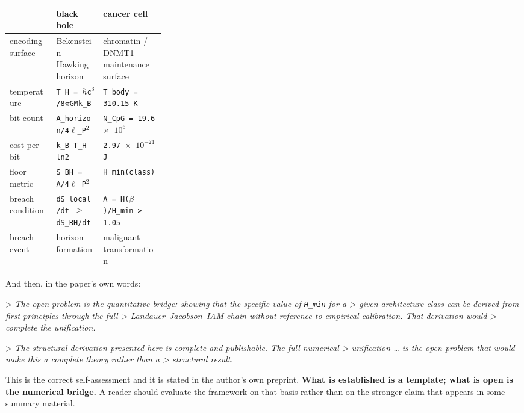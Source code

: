 \documentclass[12pt,a4paper]{article}
\begin{document}
\begin{small}
\begin{tabularx}{\linewidth}{L{0.30\linewidth}YY}
\toprule
\textbf{} & \textbf{black hole} & \textbf{cancer cell} \\
\midrule
encoding surface & Bekenstein--Hawking horizon & chromatin / DNMT1 maintenance surface \\
temperature & \texttt{T\_\allowbreak{}H = $\hbar$c$^{3}$/\allowbreak{}8$\pi$GMk\_\allowbreak{}B} & \texttt{T\_\allowbreak{}body = 310.15 K} \\
bit count & \texttt{A\_\allowbreak{}horizon/\allowbreak{}4$\ell$\_\allowbreak{}P$^{2}$} & \texttt{N\_\allowbreak{}CpG = 19.6 $\times$ $10^{6}$} \\
cost per bit & \texttt{k\_\allowbreak{}B T\_\allowbreak{}H ln2} & \texttt{2.97 $\times$ $10^{-21}$ J} \\
floor metric & \texttt{S\_\allowbreak{}BH = A/\allowbreak{}4$\ell$\_\allowbreak{}P$^{2}$} & \texttt{H\_\allowbreak{}min(class)} \\
breach condition & \texttt{dS\_\allowbreak{}local/\allowbreak{}dt $\geq$ dS\_\allowbreak{}BH/\allowbreak{}dt} & \texttt{A = H($\beta$)/\allowbreak{}H\_\allowbreak{}min > 1.05} \\
breach event & horizon formation & malignant transformation \\
\bottomrule
\end{tabularx}
\end{small}


And then, in the paper's own words:


> \textit{The open problem is the quantitative bridge: showing that the specific value of \texttt{H\_min} for a > given architecture class can be derived from first principles through the full > Landauer--Jacobson--IAM chain without reference to empirical calibration. That derivation would > complete the unification.}


> \textit{The structural derivation presented here is complete and publishable. The full numerical > unification \ldots{} is the open problem that would make this a complete theory rather than a > structural result.}


This is the correct self-assessment and it is stated in the author's own preprint. \textbf{What is established is a template; what is open is the numerical bridge.} A reader should evaluate the framework on that basis rather than on the stronger claim that appears in some summary material.
\end{document}
